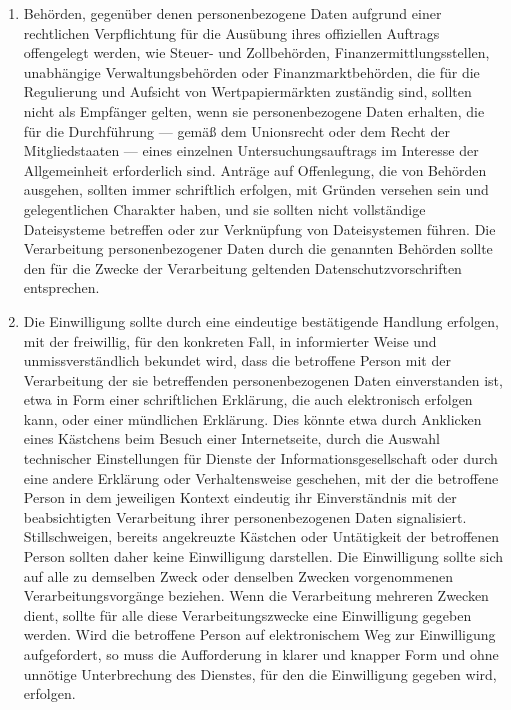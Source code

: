\begin{enumerate}
   \item Behörden, gegenüber denen personenbezogene Daten aufgrund einer rechtlichen Verpflichtung für die Ausübung
    ihres offiziellen Auftrags offengelegt werden, wie Steuer- und Zollbehörden, Finanzermittlungsstellen, unabhängige
    Verwaltungsbehörden oder Finanzmarktbehörden, die für die Regulierung und Aufsicht von Wertpapiermärkten zuständig
    sind, sollten nicht als Empfänger gelten, wenn sie personenbezogene Daten erhalten, die für die Durchführung —
    gemäß dem Unionsrecht oder dem Recht der Mitgliedstaaten — eines einzelnen Untersuchungsauftrags im Interesse der
    Allgemeinheit erforderlich sind. Anträge auf Offenlegung, die von Behörden ausgehen, sollten immer schriftlich
    erfolgen, mit Gründen versehen sein und gelegentlichen Charakter haben, und sie sollten nicht vollständige
    Dateisysteme betreffen oder zur Verknüpfung von Dateisystemen führen. Die Verarbeitung personenbezogener Daten
    durch die genannten Behörden sollte den für die Zwecke der Verarbeitung geltenden Datenschutzvorschriften
    entsprechen.%
   \label{itm:eg-31}
   

   \item Die Einwilligung sollte durch eine eindeutige bestätigende Handlung erfolgen, mit der freiwillig, für den
    konkreten Fall, in informierter Weise und unmissverständlich bekundet wird, dass die betroffene Person mit der
    Verarbeitung der sie betreffenden personenbezogenen Daten einverstanden ist, etwa in Form einer schriftlichen
    Erklärung, die auch elektronisch erfolgen kann, oder einer mündlichen Erklärung. Dies könnte etwa durch Anklicken
    eines Kästchens beim Besuch einer Internetseite, durch die Auswahl technischer Einstellungen für Dienste der
    Informationsgesellschaft oder durch eine andere Erklärung oder Verhaltensweise geschehen, mit der die betroffene
    Person in dem jeweiligen Kontext eindeutig ihr Einverständnis mit der beabsichtigten Verarbeitung ihrer
    personenbezogenen Daten signalisiert. Stillschweigen, bereits angekreuzte Kästchen oder Untätigkeit der betroffenen
    Person sollten daher keine Einwilligung darstellen. Die Einwilligung sollte sich auf alle zu demselben Zweck oder
    denselben Zwecken vorgenommenen Verarbeitungsvorgänge beziehen. Wenn die Verarbeitung mehreren Zwecken dient,
    sollte für alle diese Verarbeitungszwecke eine Einwilligung gegeben werden. Wird die betroffene Person auf
    elektronischem Weg zur Einwilligung aufgefordert, so muss die Aufforderung in klarer und knapper Form und ohne
    unnötige Unterbrechung des Dienstes, für den die Einwilligung gegeben wird, erfolgen.%
   \label{itm:eg-32}
   

\end{enumerate}

